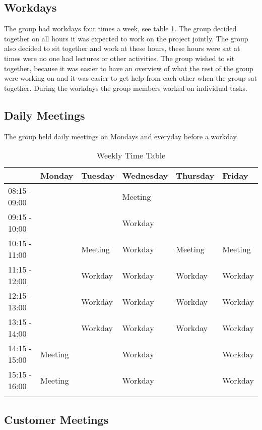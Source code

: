 \subsection{Workdays}
The group had workdays four times a week, see table \ref{Time table}. The group decided together on all hours it was expected to work on the project jointly. The group also decided to sit together and work at these hours, these hours were sat at times were no one had lectures or other activities. The group wished to sit together, because it was easier to have an overview of what the rest of the group were working on and it was easier to get help from each other when the group sat together. During the workdays the group members worked on individual tasks.

\subsection{Daily Meetings}
The group held daily meetings on Mondays and everyday before a workday. 


\begin{longtable}{|l|l|l|l|l|l|}
\hline
\rowcolor{Gray}
&\textbf{Monday} & \textbf{Tuesday} & \textbf{Wednesday} & \textbf{Thursday} & \textbf{Friday} \\
\hline
08:15 - 09:00 &               &               & Meeting &               &               \\
\hline
09:15 - 10:00 &               &               & Workday       &               &               \\
\hline
10:15 - 11:00 &               & Meeting & Workday       & Meeting & Meeting \\
\hline
11:15 - 12:00 &               & Workday       & Workday       & Workday       & Workday       \\
\hline
12:15 - 13:00 &               & Workday       & Workday       & Workday       & Workday       \\
\hline
13:15 - 14:00 &               & Workday       & Workday       & Workday       & Workday       \\
\hline
14:15 - 15:00 & Meeting &               & Workday       &               & Workday       \\
\hline
15:15 - 16:00 & Meeting &               & Workday       &               & Workday\\
\hline
\caption{Weekly Time Table}
\label{Time table}
\end{longtable}


\subsection{Customer Meetings}
